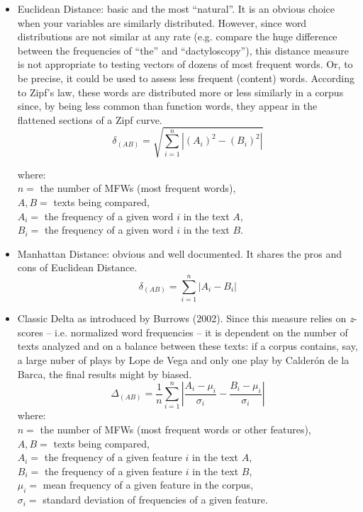 \documentclass[11pt,a4paper]{article}
\def\margin#1{\marginpar{\textcolor{blue}{\footnotesize\tt #1}}}
\begin{document}
\begin{itemize}
\item Euclidean Distance: basic and the most ``natural''.\margin{"dist.euclidean"}
It is an obvious choice when your variables are similarly distributed.
However, since word distributions are not similar at any rate (e.g.
compare the huge difference between the frequencies of ``the'' and ``dactyloscopy''),
this distance measure is not appropriate to testing vectors of dozens
of most frequent words. Or, to be precise, it could be used to assess
less frequent (content) words. According to Zipf's law, these words
are distributed more or less similarly in a corpus since, by being
less common than function words, they appear in the flattened sections
of a Zipf curve. 
\[
\delta_{(AB)}=\sqrt{\sum_{i=1}^{n}\left\vert (A_{i})^{2}-(B_{i})^{2}\right\vert }
\]



where: \\
 $n=$ the number of MFWs (most frequent words), \\
 $A,B=$ texts being compared, \\
 $A_{i}=$ the frequency of a given word $i$ in the text $A$, \\
 $B_{i}=$ the frequency of a given word $i$ in the text $B$. \\


\item \noindent Manhattan Distance: obvious and well documented.\margin{"dist.manhattan"}
It shares the pros and cons of Euclidean Distance. 
\[
\delta_{(AB)}=\sum_{i=1}^{n}\left\vert A_{i}-B_{i}\right\vert 
\]

\item Classic Delta as introduced by Burrows (2002).\margin{"dist.delta"}
Since this measure relies on \textit{z}-scores -- i.e. normalized word frequencies
-- it is dependent on the number of texts analyzed and on a balance
between these texts: if a corpus contains, say, a large nuber of plays
by Lope de Vega and only one play by Calderón de la Barca, the final
results might by biased. 
\[
\Delta_{(AB)}=\frac{1}{n}\sum_{i=1}^{n}\left\vert \frac{A_{i}-\mu_{i}}{\sigma_{i}}-\frac{B_{i}-\mu_{i}}{\sigma_{i}}\right\vert 
\]
where: \\
 $n=$ the number of MFWs (most frequent words or other features), \\
 $A,B=$ texts being compared, \\
 $A_{i}=$ the frequency of a given feature $i$ in the text $A$, \\
 $B_{i}=$ the frequency of a given feature $i$ in the text $B$, \\
 $\mu_{i}=$ mean frequency of a given feature in the corpus, \\
 $\sigma_{i}=$ standard deviation of frequencies of a given feature.



\end{itemize}
\end{document}
